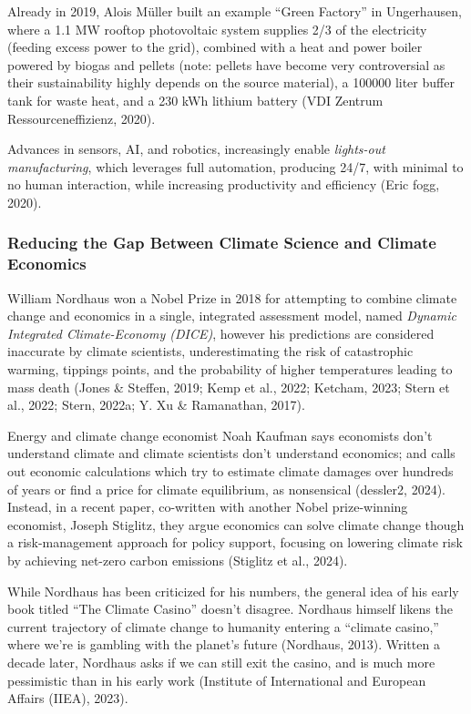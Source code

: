 \documentclass[
  12pt,
  letterpaper,
  DIV=11,
  numbers=noendperiod]{scrartcl}
\begin{document}
Already in 2019, Alois Müller built an example ``Green Factory'' in
Ungerhausen, where a 1.1 MW rooftop photovoltaic system supplies 2/3 of
the electricity (feeding excess power to the grid), combined with a heat
and power boiler powered by biogas and pellets (note: pellets have
become very controversial as their sustainability highly depends on the
source material), a 100000 liter buffer tank for waste heat, and a 230
kWh lithium battery (VDI Zentrum Ressourceneffizienz, 2020).

Advances in sensors, AI, and robotics, increasingly enable
\emph{lights-out manufacturing}, which leverages full automation,
producing 24/7, with minimal to no human interaction, while increasing
productivity and efficiency (Eric fogg, 2020).

\subsubsection{Reducing the Gap Between Climate Science and Climate
Economics}\label{reducing-the-gap-between-climate-science-and-climate-economics}

William Nordhaus won a Nobel Prize in 2018 for attempting to combine
climate change and economics in a single, integrated assessment model,
named \emph{Dynamic Integrated Climate-Economy (DICE)}, however his
predictions are considered inaccurate by climate scientists,
underestimating the risk of catastrophic warming, tippings points, and
the probability of higher temperatures leading to mass death (Jones \&
Steffen, 2019; Kemp et al., 2022; Ketcham, 2023; Stern et al., 2022;
Stern, 2022a; Y. Xu \& Ramanathan, 2017).

Energy and climate change economist Noah Kaufman says economists don't
understand climate and climate scientists don't understand economics;
and calls out economic calculations which try to estimate climate
damages over hundreds of years or find a price for climate equilibrium,
as nonsensical (dessler2, 2024). Instead, in a recent paper, co-written
with another Nobel prize-winning economist, Joseph Stiglitz, they argue
economics can solve climate change though a risk-management approach for
policy support, focusing on lowering climate risk by achieving net-zero
carbon emissions (Stiglitz et al., 2024).

While Nordhaus has been criticized for his numbers, the general idea of
his early book titled ``The Climate Casino'' doesn't disagree. Nordhaus
himself likens the current trajectory of climate change to humanity
entering a ``climate casino,'' where we're is gambling with the planet's
future (Nordhaus, 2013). Written a decade later, Nordhaus asks if we can
still exit the casino, and is much more pessimistic than in his early
work (Institute of International and European Affairs (IIEA), 2023).
\end{document}
